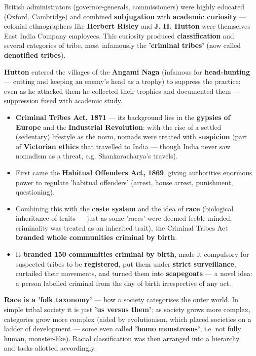 British administrators (governor-generals, commissioners) were highly educated (Oxford, Cambridge) and combined \textbf{subjugation} with \textbf{academic curiosity} --- colonial ethnographers like \textbf{Herbert Risley} and \textbf{J. H. Hutton} were themselves East India Company employees. This curiosity produced \textbf{classification} and several categories of tribe, most infamously the \textbf{'criminal tribes'} (now called \textbf{denotified tribes}).

\begin{ExampleBox}
\textbf{Hutton} entered the villages of the \textbf{Angami Naga} (infamous for \textbf{head-hunting} --- cutting and keeping an enemy's head as a trophy) to suppress the practice; even as he attacked them he collected their trophies and documented them --- suppression fused with academic study.
\end{ExampleBox}

\begin{GovtPolicy}
\begin{itemize}
\item \textbf{Criminal Tribes Act, 1871} --- its background lies in the \textbf{gypsies of Europe} and the \textbf{Industrial Revolution}: with the rise of a settled (sedentary) lifestyle as the norm, nomads were treated with \textbf{suspicion} (part of \textbf{Victorian ethics} that travelled to India --- though India never saw nomadism as a threat, e.g. Shankaracharya's travels).
\item First came the \textbf{Habitual Offenders Act, 1869}, giving authorities enormous power to regulate 'habitual offenders' (arrest, house arrest, punishment, questioning).
\item Combining this with the \textbf{caste system} and the idea of \textbf{race} (biological inheritance of traits --- just as some 'races' were deemed feeble-minded, criminality was treated as an inherited trait), the Criminal Tribes Act \textbf{branded whole communities criminal by birth}.
\item It \textbf{branded 150 communities criminal by birth}, made it compulsory for suspected tribes to be \textbf{registered}, put them under \textbf{strict surveillance}, curtailed their movements, and turned them into \textbf{scapegoats} --- a novel idea: a person labelled criminal from the day of birth irrespective of any act.
\end{itemize}
\end{GovtPolicy}

\begin{KeyConcept}
\textbf{Race is a 'folk taxonomy'} --- how a society categorises the outer world. In simple tribal society it is just \textbf{'us versus them'}; as society grows more complex, categories grow more complex (aided by evolutionism, which placed societies on a ladder of development --- some even called \textbf{'homo monstrosus'}, i.e. not fully human, monster-like). Racial classification was then arranged into a hierarchy and tasks allotted accordingly.
\end{KeyConcept}


